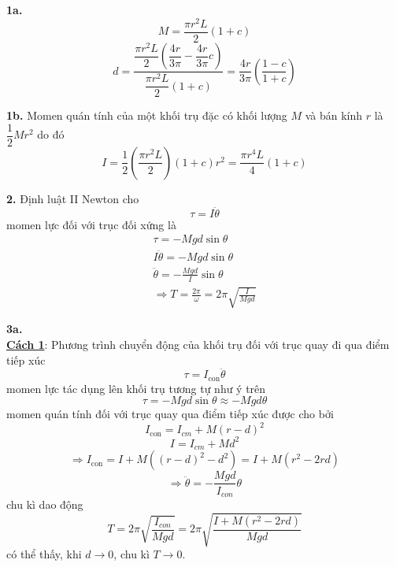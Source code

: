 \noindent\textbf{1a.}
\begin{equation*}
  M=\frac{\pi r^{2}L}{2}(1+c)
\end{equation*}
\begin{equation*}
  d=\frac{\dfrac{\pi r^{2}L}{2}\left(\dfrac{4r}{3\pi}-\dfrac{4r}{3\pi}c\right)}{\dfrac{\pi r^{2}L}{2}(1+c)}=\frac{4r}{3\pi}\left(\frac{1-c}{1+c}\right)
\end{equation*}

\noindent\textbf{1b.} Momen quán tính của một khối trụ đặc có khối lượng $M$ và bán kính $r$ là $\dfrac{1}{2}Mr^2$ do đó
\begin{equation*}
  I=\frac{1}{2}\left(\frac{\pi r^{2}L}{2}\right)(1+c)r^{2}=\frac{\pi r^{4}L}{4}(1+c)
\end{equation*}

\noindent\textbf{2.} Định luật II Newton cho
\begin{equation*}
  \tau=I\ddot{\theta}
\end{equation*}
momen lực đối với trục đối xứng là
\begin{equation*}
  \begin{gathered}
    \tau=-Mgd\sin\theta \\
    I\ddot{\theta}=-Mgd\sin\theta \\
    \ddot{\theta}=-\frac{Mgd}{I}\sin\theta \\
    \Rightarrow T=\frac{2\pi}{\omega}=2\pi\sqrt{\frac{I}{Mgd}}
  \end{gathered}
\end{equation*}

\noindent\textbf{3a.} \\
\noindent\underline{\textbf{Cách 1}}: Phương trình chuyển động của khối trụ đối với trục quay đi qua điểm tiếp xúc
\begin{equation*}
  \tau=I_{\text{con}}\ddot{\theta}
\end{equation*}
momen lực tác dụng lên khối trụ tương tự như ý trên
\begin{equation*}
  \tau = -Mgd\sin\theta\approx - M g d \theta
\end{equation*}
momen quán tính đối với trục quay qua điểm tiếp xúc được cho bởi
\begin{equation*}
  I_{\text{con}}=I_{cm}+M(r-d)^{2}
\end{equation*}
\begin{equation*}
  I=I_{cm}+Md^{2}
\end{equation*}
\begin{equation*}
  \Rightarrow I_{\text{con}}=I+M((r-d)^{2}-d^{2})=I+M(r^{2}-2rd)
\end{equation*}
\begin{equation*}
  \Rightarrow\ddot{\theta}=-\frac{Mgd}{I_{con}}\theta
\end{equation*}
chu kì dao động
\begin{equation*}
  T=2\pi\sqrt{\frac{I_{con}}{Mgd}}=2\pi\sqrt{\frac{I+M(r^{2}-2rd)}{Mgd}}
\end{equation*}
có thể thấy, khi $d\rightarrow0$, chu kì $T\rightarrow0$.\\

